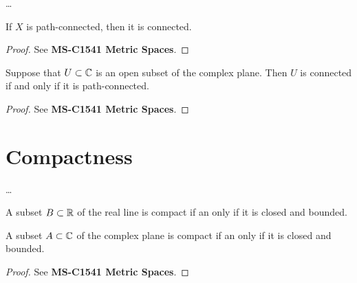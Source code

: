 \begin{definition}
  \label{def:path_connected}
  \ldots
\end{definition}

\begin{lemma}
  \label{lem:path_connected_implies_connected}
  If $X$ is path-connected, then it is connected.
\end{lemma}
\begin{proof}
  See \textbf{MS-C1541 Metric Spaces}.
\end{proof}

\begin{lemma}
  \label{lem:open_connected_iff_path_connected}
  Suppose that $U \subset \mathbb{C}$ is an open subset of the complex plane.
  Then $U$ is connected if and only if it is path-connected.
\end{lemma}
\begin{proof}
  See \textbf{MS-C1541 Metric Spaces}.
\end{proof}

\section{Compactness}

\begin{definition}[Compactness]
  \label{def:compact}
  \ldots
\end{definition}

\begin{theorem}
  \label{thm:bolzano_weierstrass}
  A subset $B \subset \mathbb{R}$ of the real line is compact
  if an only if it is closed and bounded.

  A subset $A \subset \mathbb{C}$ of the complex plane is compact
  if an only if it is closed and bounded.
\end{theorem}
\begin{proof}
  See \textbf{MS-C1541 Metric Spaces}.
\end{proof}

